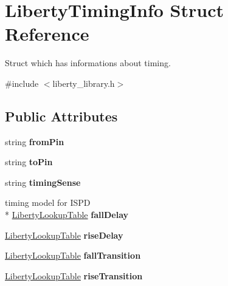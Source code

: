 \hypertarget{structLibertyTimingInfo}{\section{Liberty\-Timing\-Info Struct Reference}
\label{structLibertyTimingInfo}
}


Struct which has informations about timing.  




{\ttfamily \#include $<$liberty\-\_\-library.\-h$>$}

\subsection*{Public Attributes}
\begin{DoxyCompactItemize}
\item 
\hypertarget{structLibertyTimingInfo_a6cb3b02b8c016a6a0f633ade7a8ee499}{string {\bfseries from\-Pin}}\label{structLibertyTimingInfo_a6cb3b02b8c016a6a0f633ade7a8ee499}

\item 
\hypertarget{structLibertyTimingInfo_a2bc2b4f64c8a8b71e314b97a37f14db4}{string {\bfseries to\-Pin}}\label{structLibertyTimingInfo_a2bc2b4f64c8a8b71e314b97a37f14db4}

\item 
\hypertarget{structLibertyTimingInfo_a54b164af0fb48cdbceb754858cbeface}{string {\bfseries timing\-Sense}}\label{structLibertyTimingInfo_a54b164af0fb48cdbceb754858cbeface}

\item 
\hypertarget{structLibertyTimingInfo_a4fdd676db9841962ef570a064ff97c81}{timing model for I\-S\-P\-D \\*
\hyperlink{structLibertyLookupTable}{Liberty\-Lookup\-Table} {\bfseries fall\-Delay}}\label{structLibertyTimingInfo_a4fdd676db9841962ef570a064ff97c81}

\item 
\hypertarget{structLibertyTimingInfo_af2baf3e8053ed178d0d3dc8159ab8248}{\hyperlink{structLibertyLookupTable}{Liberty\-Lookup\-Table} {\bfseries rise\-Delay}}\label{structLibertyTimingInfo_af2baf3e8053ed178d0d3dc8159ab8248}

\item 
\hypertarget{structLibertyTimingInfo_a5af7b44ccbb69224084557182d2e3acb}{\hyperlink{structLibertyLookupTable}{Liberty\-Lookup\-Table} {\bfseries fall\-Transition}}\label{structLibertyTimingInfo_a5af7b44ccbb69224084557182d2e3acb}

\item 
\hypertarget{structLibertyTimingInfo_a1b31e1e18c0cc373e1eeaa1e999fbedd}{\hyperlink{structLibertyLookupTable}{Liberty\-Lookup\-Table} {\bfseries rise\-Transition}}\label{structLibertyTimingInfo_a1b31e1e18c0cc373e1eeaa1e999fbedd}

\end{DoxyCompactItemize}


